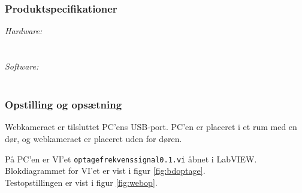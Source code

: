 		\subsubsection{Produktspecifikationer}
	
			\textit{Hardware:}\\
			\webcammic\\
			\PC\\
	
			\textit{Software:}\\
			\labview\\
	
		\subsubsection{Opstilling og opsætning}
		Webkameraet er tilsluttet PC'ens USB-port. PC'en er placeret i et rum med en dør, og webkameraet er placeret uden for døren. 
			
			På PC'en er VI'et \texttt{optagefrekvenssignal0.1.vi} åbnet i LabVIEW. Blokdiagrammet for VI'et er vist i figur \ref{fig:bdoptage}.   \\   
			
			Testopstillingen er vist i figur \ref{fig:webop}.\\ 
		
		
			

